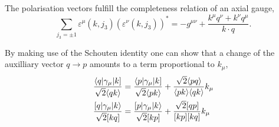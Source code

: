 \documentclass[a4paper,12pt]{amsart}
\newcommand{\Spaa}[1]{\langle #1 \rangle}
\newcommand{\Spab}[1]{\langle #1]}
\newcommand{\Spba}[1]{[ #1 \rangle}
\newcommand{\Spbb}[1]{[ #1 ]}
\begin{document}
The polarisation vectors fulfill the completeness relation of an
axial gauge,
\begin{equation}
\sum_{j_3=\pm1}\varepsilon^\mu(k, j_3)%
\left(\varepsilon^\nu(k, j_3)\right)^\ast=
-g^{\mu\nu}+\frac{k^\mu q^\nu+k^\nu q^\mu}{k\cdot q}\text{.}
\end{equation}

By making use of the Schouten identity one can show that a change
of the auxilliary vector $q\rightarrow p$ amounts to a term
proportional to $k_\mu$,
\begin{subequations}
\begin{align}
\frac{\Spab{q\vert\gamma_\mu\vert k}}{%
   \sqrt{2}\Spaa{qk}}
&=\frac{\Spab{p\vert\gamma_\mu\vert k}}{%
   \sqrt{2}\Spaa{pk}}+
\frac{\sqrt{2}\Spaa{pq}}{\Spaa{pk}\Spaa{qk}}k_\mu\\
\frac{\Spba{q\vert\gamma_\mu\vert k}}{%
   \sqrt{2}\Spbb{kq}}
&=\frac{\Spba{p\vert\gamma_\mu\vert k}}{%
   \sqrt{2}\Spbb{kp}}+
\frac{\sqrt{2}\Spbb{qp}}{\Spbb{kp}\Spbb{kq}}k_\mu
\end{align}
\end{subequations}
\end{document}
